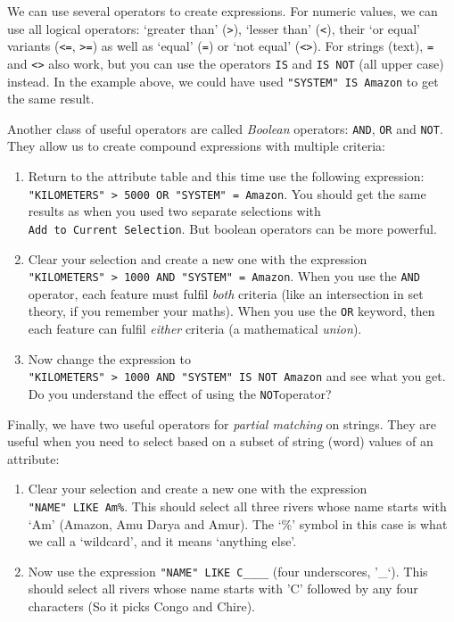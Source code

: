\documentclass[
  letterpaper,
  DIV=11,
  numbers=noendperiod]{scrreprt}
\begin{document}
We can use several operators to create expressions. For numeric values,
we can use all logical operators: `greater than'
(\texttt{\textgreater{}}), `lesser than' (\texttt{\textless{}}), their
`or equal' variants (\texttt{\textless{}=}, \texttt{\textgreater{}=}) as
well as `equal' (\texttt{=}) or `not equal'
(\texttt{\textless{}\textgreater{}}). For strings (text), \texttt{=} and
\texttt{\textless{}\textgreater{}} also work, but you can use the
operators \texttt{IS} and \texttt{IS\ NOT} (all upper case) instead. In
the example above, we could have used
\texttt{"SYSTEM"\ IS\ \textquotesingle{}Amazon\textquotesingle{}} to get
the same result.

Another class of useful operators are called \emph{Boolean} operators:
\texttt{AND}, \texttt{OR} and \texttt{NOT}. They allow us to create
compound expressions with multiple criteria:

\begin{enumerate}
\def\labelenumi{(\arabic{enumi})}
\setcounter{enumi}{84}
\item
  Return to the attribute table and this time use the following
  expression:
  \texttt{"KILOMETERS"\ \textgreater{}\ 5000\ OR\ "SYSTEM"\ =\ \textquotesingle{}Amazon\textquotesingle{}}.
  You should get the same results as when you used two separate
  selections with \texttt{Add\ to\ Current\ Selection}. But boolean
  operators can be more powerful.
\item
  Clear your selection and create a new one with the expression
  \texttt{"KILOMETERS"\ \textgreater{}\ 1000\ AND\ "SYSTEM"\ =\ \textquotesingle{}Amazon\textquotesingle{}}.
  When you use the \texttt{AND} operator, each feature must fulfil
  \emph{both} criteria (like an intersection in set theory, if you
  remember your maths). When you use the \texttt{OR} keyword, then each
  feature can fulfil \emph{either} criteria (a mathematical
  \emph{union}).
\item
  Now change the expression to
  \texttt{"KILOMETERS"\ \textgreater{}\ 1000\ AND\ "SYSTEM"\ IS\ NOT\ \textquotesingle{}Amazon\textquotesingle{}}
  and see what you get. Do you understand the effect of using the
  \texttt{NOT}operator?
\end{enumerate}

Finally, we have two useful operators for \emph{partial matching} on
strings. They are useful when you need to select based on a subset of
string (word) values of an attribute:

\begin{enumerate}
\def\labelenumi{(\arabic{enumi})}
\setcounter{enumi}{87}
\item
  Clear your selection and create a new one with the expression
  \texttt{"NAME"\ LIKE\ \textquotesingle{}Am\%\textquotesingle{}}. This
  should select all three rivers whose name starts with `Am' (Amazon,
  Amu Darya and Amur). The `\%' symbol in this case is what we call a
  `wildcard', and it means `anything else'.
\item
  Now use the expression
  \texttt{"NAME"\ LIKE\ \textquotesingle{}C\_\_\_\_\textquotesingle{}}
  (four underscores, '\_`). This should select all rivers whose name
  starts with 'C' followed by any four characters (So it picks Congo and
  Chire).
\end{enumerate}
\end{document}
